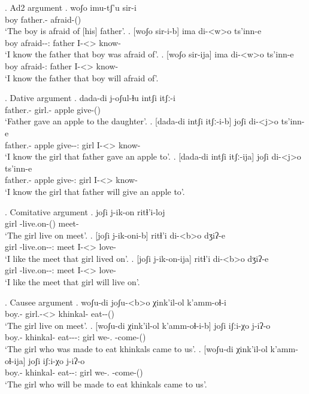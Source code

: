 \ex. Ad2 argument
	\ag. woʃo imu-tʃ'u sir-i\\
			{boy} {father.\Obl-\Ads} {afraid-\Pst(\Aor)}\\
			\glt `The boy is afraid of [his] father'.
	\bg. [woʃo sir-i-b] ima di-<w>o ts'inn-e\\
			{boy} {afraid-\Pst-\Ptcp:\Pst} father {I-<\M>\Aff} {know-\Hab} \\
			\glt `I know the father that boy was afraid of'.
	\bg. [woʃo sir-ija] ima di-<w>o ts'inn-e\\
			{boy} {afraid-\Ptcp:\Prae} father {I-<\M>\Aff} {know-\Hab} \\
			\glt `I know the father that boy will afraid of'.

\ex. Dative argument
	\ag. dada-di j-oʃul-ɬu intʃi itʃː-i\\
			{father.\Obl-\Erg} {girl.\Obl-\Dat} apple {give-\Pst(\Aor)}\\
			\glt `Father gave an apple to the daughter'.
	\bg. [dada-di intʃi itʃː-i-b] joʃi di-<j>o ts'inn-e\\
			{father.\Obl-\Erg} apple {give-\Pst-\Ptcp:\Pst} {girl} {I-<\F>\Aff} {know-\Hab} \\
			\glt `I know the girl that father gave an apple to'.
	\bg. [dada-di intʃi itʃː-ija] joʃi di-<j>o ts'inn-e\\
			{father.\Obl-\Erg} apple {give-\Ptcp:\Prae} {girl} {I-<\F>\Aff} {know-\Hab} \\
			\glt `I know the girl that father will give an apple to'.

\ex. Comitative argument
	\ag. joʃi j-ik-on ritɬ'i-loj\\
			girl {\F-live.on-\Pst(\Aor)} {meet-\Com}\\
			\glt `The girl live on meet'.
	\bg. [joʃi j-ik-oni-b] ritɬ'i di-<b>o dʒiʔ-e\\
			girl {\F-live.on-\Pst-\Ptcp:\Pst} meet {I-<\Nanf>\Aff} {love-\Hab}\\
			\glt `I like the meet that girl lived on'.
	\bg. [joʃi j-ik-on-ija] ritɬ'i di-<b>o dʒiʔ-e\\
			girl {\F-live.on-\Npst-\Ptcp:\Prae} meet {I-<\Nanf>\Aff} {love-\Hab}\\
			\glt `I like the meet that girl will live on'.

\ex. Causee argument
	\ag. woʃu-di joʃu-<b>o χink'il-ol k'amm-oɬ-i\\
			{boy.\Obl-\Erg} {girl.\Obl-<\Nanf>\Aff} {khinkal-\Pl} {eat-\Caus-\Pst(\Aor)}\\
			\glt `The girl live on meet'.
	\bg. [woʃu-di χink'il-ol k'amm-oɬ-i-b] joʃi iʃːi-χo j-iʔ-o\\
			{boy.\Obl-\Erg} {khinkal-\Pl} {eat-\Caus-\Pst-\Ptcp:\Pst} girl {we-\Add.\Lat} {\F-come-\Pst(\Aor)}\\
			\glt `The girl who was made to eat khinkals came to us'.
	\bg. [woʃu-di χink'il-ol k'amm-oɬ-ija] joʃi iʃːi-χo j-iʔ-o\\
			{boy.\Obl-\Erg} {khinkal-\Pl} {eat-\Caus-\Ptcp:\Prae} girl {we-\Add.\Lat} {\F-come-\Pst(\Aor)}\\
			\glt `The girl who will be made to eat khinkals came to us'.
						
